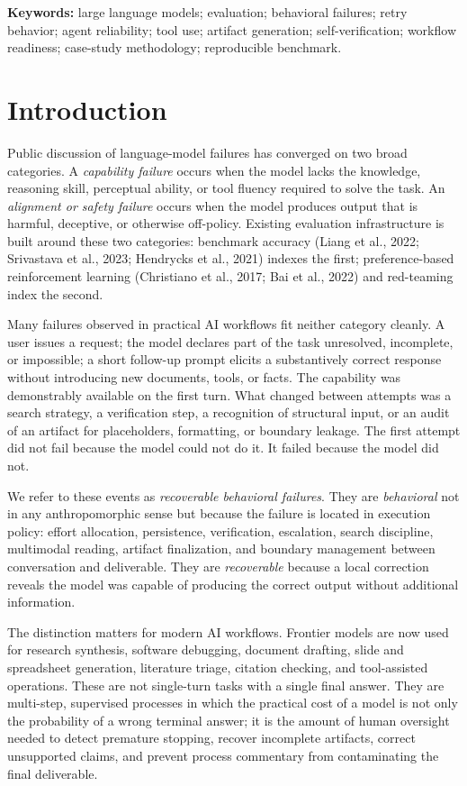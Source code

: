 \documentclass[11pt]{article}
\begin{document}
\noindent\textbf{Keywords:} large language models; evaluation; behavioral failures; retry behavior; agent reliability; tool use; artifact generation; self-verification; workflow readiness; case-study methodology; reproducible benchmark.

\tableofcontents
\newpage


\section{Introduction}

Public discussion of language-model failures has converged on two broad categories. A \emph{capability failure} occurs when the model lacks the knowledge, reasoning skill, perceptual ability, or tool fluency required to solve the task. An \emph{alignment or safety failure} occurs when the model produces output that is harmful, deceptive, or otherwise off-policy. Existing evaluation infrastructure is built around these two categories: benchmark accuracy (Liang et al., 2022; Srivastava et al., 2023; Hendrycks et al., 2021) indexes the first; preference-based reinforcement learning (Christiano et al., 2017; Bai et al., 2022) and red-teaming index the second.

Many failures observed in practical AI workflows fit neither category cleanly. A user issues a request; the model declares part of the task unresolved, incomplete, or impossible; a short follow-up prompt elicits a substantively correct response without introducing new documents, tools, or facts. The capability was demonstrably available on the first turn. What changed between attempts was a search strategy, a verification step, a recognition of structural input, or an audit of an artifact for placeholders, formatting, or boundary leakage. The first attempt did not fail because the model could not do it. It failed because the model did not.

We refer to these events as \emph{recoverable behavioral failures}. They are \emph{behavioral} not in any anthropomorphic sense but because the failure is located in execution policy: effort allocation, persistence, verification, escalation, search discipline, multimodal reading, artifact finalization, and boundary management between conversation and deliverable. They are \emph{recoverable} because a local correction reveals the model was capable of producing the correct output without additional information.

The distinction matters for modern AI workflows. Frontier models are now used for research synthesis, software debugging, document drafting, slide and spreadsheet generation, literature triage, citation checking, and tool-assisted operations. These are not single-turn tasks with a single final answer. They are multi-step, supervised processes in which the practical cost of a model is not only the probability of a wrong terminal answer; it is the amount of human oversight needed to detect premature stopping, recover incomplete artifacts, correct unsupported claims, and prevent process commentary from contaminating the final deliverable.
\end{document}
